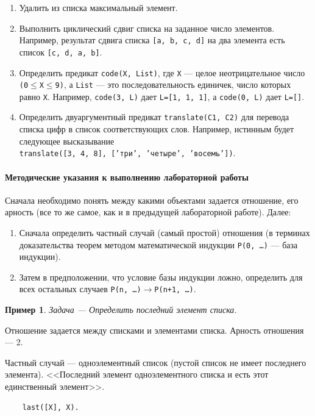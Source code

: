 \documentclass[12pt, openany, twoside]{book} %
\newtheorem{example}{Пример}[chapter]
\begin{document}
\begin{enumerate}
\item Удалить из списка максимальный элемент.
\item Выполнить циклический сдвиг списка на заданное число элементов. Например, результат сдвига списка {\tt [a, b, c, d]} на два элемента есть список {\tt [c, d, a, b]}.
\item Определить предикат {\tt code(Х, List)}, где {\tt Х} --- целое неотрицательное число {\tt (0}$\leq${\tt X}$\leq${\tt 9)}, а {\tt List} --- это последовательность  единичек, число  которых  равно  {\tt Х}.  Например, {\tt code(3, L)} дает {\tt L=[1, 1, 1]}, а {\tt code(0, L)} дает {\tt L=[]}.
\item Определить двуаргументный предикат {\tt translate(С1, С2)} для перевода списка цифр в список соответствующих слов. Например, истинным будет следующее высказывание\\
     {\tt translate([3, 4, 8], ['три', 'четыре', 'восемь'])}.
\end{enumerate}

\paragraph{Методические указания к выполнению лабораторной работы}
  Сначала необходимо понять между какими объектами задается отношение, его арность (все то же самое, как и в предыдущей лабораторной работе). Далее:
  \begin{enumerate}
  \item Сначала определить частный случай (самый простой) отношения (в терминах доказательства теорем методом математической индукции {\tt P(0, \ldots)} --- база индукции).
  \item Затем в предположении, что условие базы индукции ложно, определить для всех остальных случаев {\tt P(n, \ldots)$\to$P(n+1, \ldots)}.
  \end{enumerate}

\begin{example}
  Задача --- Определить последний элемент списка.
\end{example}
  Отношение задается между списками и элементами списка. Арность отношения --- 2.

Частный случай --- одноэлементный список (пустой список не имеет последнего элемента). <<Последний элемент одноэлементного списка и есть этот единственный элемент>>.

{\tt\begin{verbatim}
    last([X], X).
\end{verbatim}}
\end{document}
